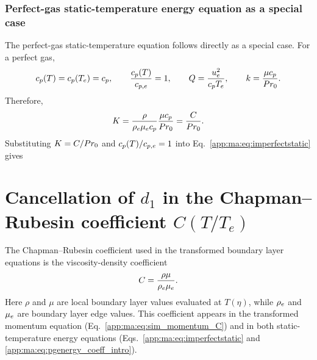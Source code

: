 \subsubsection{Perfect-gas static-temperature energy equation as a special case}
\label{app:ma:subsubsec:derv_perf_energy_similarity}

The perfect-gas static-temperature equation follows directly as a special case. For a perfect gas,
\begin{equation}
  c_p(T)=c_p(T_e)=c_p,\qquad
  \frac{c_p(T)}{c_{p,e}}=1,\qquad
  Q=\frac{u_e^2}{c_pT_e},
  \qquad
  k=\frac{\mu c_p}{Pr_0}.
  \label{app:ma:eq:perfect_limits}
\end{equation}
Therefore,
\begin{equation}
  K
  =
  \frac{\rho}{\rho_e\mu_e c_p}\frac{\mu c_p}{Pr_0}
  =
  \frac{C}{Pr_0}.
  \label{app:ma:eq:K_to_CPr}
\end{equation}
Substituting \(K=C/Pr_0\) and \(c_p(T)/c_{p,e}=1\) into Eq.~\eqref{app:ma:eq:imperfectstatic} gives


\section{Cancellation of \texorpdfstring{\(d_1\)}{d1} in the Chapman--Rubesin coefficient \texorpdfstring{\(C(T/T_e)\)}{C(T/Te)}}
\label{app:ma:sec:C_dependence}

The Chapman--Rubesin coefficient used in the transformed boundary layer equations is the viscosity-density coefficient
\begin{equation}
  C
  =
  \frac{\rho\mu}{\rho_e\mu_e}.
  \label{app:ma:eq:C_appendix_def}
\end{equation}
Here \(\rho\) and \(\mu\) are local boundary layer values evaluated at \(T(\eta)\), while \(\rho_e\) and \(\mu_e\) are boundary layer edge values. This coefficient appears in the transformed momentum equation (Eq.~\eqref{app:ma:eq:sim_momentum_C}) and in both static-temperature energy equations (Eqs.~\eqref{app:ma:eq:imperfectstatic} and \eqref{app:ma:eq:pgenergy_coeff_intro}).

